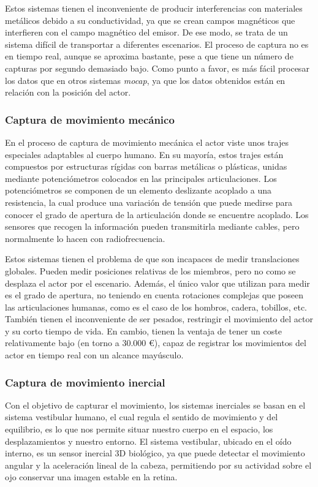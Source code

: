 Estos sistemas tienen el inconveniente de producir interferencias con materiales metálicos debido a su conductividad, ya que se crean campos magnéticos que interfieren con el campo magnético del emisor. De ese modo, se trata de un sistema difícil de transportar a diferentes escenarios. El proceso de captura no es en tiempo real, aunque se aproxima bastante, pese a que tiene un número de capturas por segundo demasiado bajo. Como punto a favor, es más fácil procesar los datos que en otros sistemas \textit{mocap}, ya que los datos obtenidos están en relación con la posición del actor.


\subsubsection{Captura de movimiento mecánico}

En el proceso de captura de movimiento mecánica el actor viste unos trajes especiales adaptables al cuerpo humano. En su mayoría, estos trajes están compuestos por estructuras rígidas con barras metálicas o plásticas, unidas mediante potenciómetros colocados en las principales articulaciones. Los potenciómetros se componen de un elemento deslizante acoplado a una resistencia, la cual produce una variación de tensión que puede medirse para conocer el grado de apertura de la articulación donde se encuentre acoplado. Los sensores que recogen la información pueden transmitirla mediante cables, pero normalmente lo hacen con radiofrecuencia.

Estos sistemas tienen el problema de que son incapaces de medir translaciones globales. Pueden medir posiciones relativas de los miembros, pero no como se desplaza el actor por el escenario. Además, el único valor que utilizan para medir es el grado de apertura, no teniendo en cuenta rotaciones complejas que poseen las articulaciones humanas, como es el caso de los hombros, cadera, tobillos, etc. También tienen el inconveniente de ser pesados, restringir el movimiento del actor y su corto tiempo de vida. En cambio, tienen la ventaja de tener un coste relativamente bajo (en torno a 30.000 \euro), capaz de registrar los movimientos del actor en tiempo real con un alcance mayúsculo. 

\subsubsection{Captura de movimiento inercial}

Con el objetivo de capturar el movimiento, los sistemas inerciales se basan en el sistema vestibular humano, el cual regula el sentido de movimiento y del equilibrio, es lo que nos permite situar nuestro cuerpo en el espacio, los desplazamientos y nuestro entorno. El sistema vestibular, ubicado en el oído interno, es un sensor inercial 3D biológico, ya que puede detectar el movimiento angular y la aceleración lineal de la cabeza, permitiendo por su actividad sobre el ojo conservar una imagen estable en la retina. 

